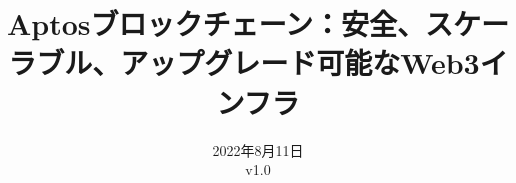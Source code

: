 \documentclass{article}
\title{Aptosブロックチェーン：安全、スケーラブル、アップグレード可能なWeb3インフラ}
\author{}
\date{2022年8月11日\\v1.0}
\begin{document}
\maketitle

\renewcommand{\abstractname}{要約}
\renewcommand{\figurename}{絵}

\end{document}
